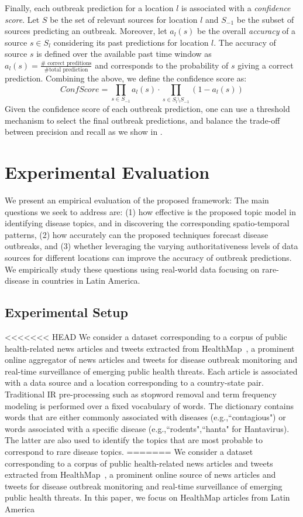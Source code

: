 \documentclass[conference]{IEEEtran}
\begin{document}
Finally, each outbreak prediction for a location $l$ is associated with a {\em confidence score}. Let $S$ be the set of relevant sources for location $l$ and $S_{-1}$ be the subset of sources predicting an outbreak. Moreover, let $a_l(s)$ be the overall {\em accuracy} of a source $s \in S_l$ considering its past predictions for location $l$. The accuracy of source $s$ is defined over the available past time window as $a_l(s) = \frac{\#\mbox{ correct preditions}}{\#\mbox{total prediction}}$ and corresponds to the probability of $s$ giving a correct prediction. Combining the above, we define the confidence score as: 
\begin{equation}
ConfScore = \prod_{s \in S_{-1}}a_l(s) \cdot \prod_{s \in S_l \setminus S_{-1}} (1 - a_l(s))
\end{equation}
Given the confidence score of each outbreak prediction, one can use a threshold mechanism to select the final outbreak predictions, and balance the trade-off between precision and recall as we show in . 

\section{Experimental Evaluation}
\label{sec:exp}
We present an empirical evaluation of the proposed framework: The main questions we seek to address are: (1) how effective is the proposed topic model in identifying disease topics, and in discovering the corresponding spatio-temporal patterns, (2) how accurately can the proposed techniques forecast disease outbreaks, and (3) whether leveraging the varying authoritativeness levels of data sources for different locations can improve the accuracy of outbreak predictions. We empirically study these questions using real-world data focusing on rare-disease in countries in Latin America.

\subsection{Experimental Setup}
<<<<<<< HEAD
 We consider a dataset corresponding to a corpus of public health-related news articles and tweets extracted from HealthMap~\cite{healthmap}, a prominent online aggregator of news articles and tweets for disease outbreak monitoring and real-time surveillance of emerging public health threats. Each article is associated with a data source and a location corresponding to a country-state pair. Traditional IR pre-processing such as stopword removal and term frequency modeling is performed over a fixed vocabulary of words. The dictionary contains words that are either commonly associated with diseases (e.g.,``contagious") or words associated with a specific disease (e.g.,``rodents",``hanta" for Hantavirus). The latter are also used to identify the topics that are most probable to correspond to rare disease topics. 
=======
 We consider a dataset corresponding to a corpus of public health-related news articles and tweets extracted from HealthMap~\cite{healthmap}, a prominent online source of news articles and tweets for disease outbreak monitoring and real-time surveillance of emerging public health threats. In this paper, we focus on HealthMap articles from Latin America
\end{document}
